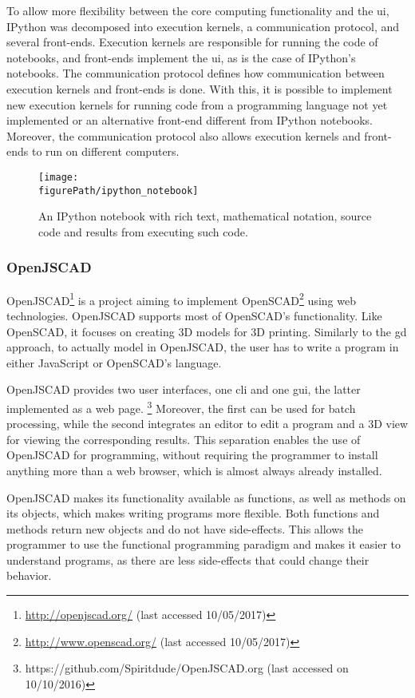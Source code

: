 To allow more flexibility between the core computing functionality and the \gls{ui}, IPython was decomposed into execution kernels, a communication protocol, and several front-ends.
Execution kernels are responsible for running the code of notebooks, and front-ends implement the \gls{ui}, as is the case of IPython's notebooks.
The communication protocol defines how communication between execution kernels and front-ends is done.
With this, it is possible to implement new execution kernels for running code from a programming language not yet implemented or an alternative front-end different from IPython notebooks.
Moreover, the communication protocol also allows execution kernels and front-ends to run on different computers\cite{PER-GRA:2007}.

\begin{figure}
	\centering
	\texttt{[image: \\figurePath/ipython\_notebook]}
	\caption{An IPython notebook with rich text, mathematical notation, source code and results from executing such code.}
	\label{fig:ipython:notebook}
\end{figure}


\subsubsection{OpenJSCAD}
OpenJSCAD\footnote{\url{http://openjscad.org/} (last accessed 10/05/2017)} is a project aiming to implement OpenSCAD\footnote{\url{http://www.openscad.org/} (last accessed 10/05/2017)} using web technologies.
OpenJSCAD supports most of OpenSCAD's functionality.
Like OpenSCAD, it focuses on creating 3D models for 3D printing.
Similarly to the \gls{gd} approach, to actually model in OpenJSCAD, the user has to write a program in either JavaScript or OpenSCAD's language.

OpenJSCAD provides two user interfaces, one \acrfull{cli} and one \acrfull{gui}, the latter implemented as a web page.%
\footnote{https://github.com/Spiritdude/OpenJSCAD.org (last accessed on 10/10/2016)}
Moreover, the first can be used for batch processing, while the second integrates an editor to edit a program and a 3D view for viewing the corresponding results.
This separation enables the use of OpenJSCAD for programming, without requiring the programmer to install anything more than a web browser, which is almost always already installed.

OpenJSCAD makes its functionality available as functions, as well as methods on its objects, which makes writing programs more flexible.
Both functions and methods return new objects and do not have side-effects.
This allows the programmer to use the functional programming paradigm and makes it easier to understand programs, as there are less side-effects that could change their behavior.


